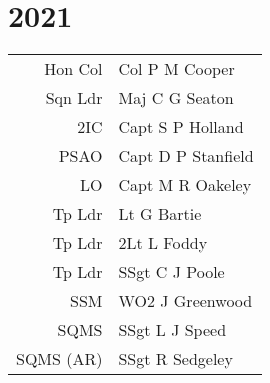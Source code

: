 \chapter*{2021}

\vspace*{10mm}

\begin{center}
  \small
  \begin{tabular}{rl}
    Hon Col & Col P M Cooper \\
    Sqn Ldr & Maj C G Seaton \\
    2IC & Capt S P Holland \\
    PSAO & Capt D P Stanfield \\
    LO & Capt M R Oakeley \\
    Tp Ldr & Lt G Bartie \\
    Tp Ldr & 2Lt L Foddy \\
    Tp Ldr & SSgt C J Poole \\
    SSM & WO2 J Greenwood \\
    SQMS & SSgt L J Speed \\
    SQMS (AR) & SSgt R Sedgeley \\
  \end{tabular}
\end{center}

\vspace*{5mm}

